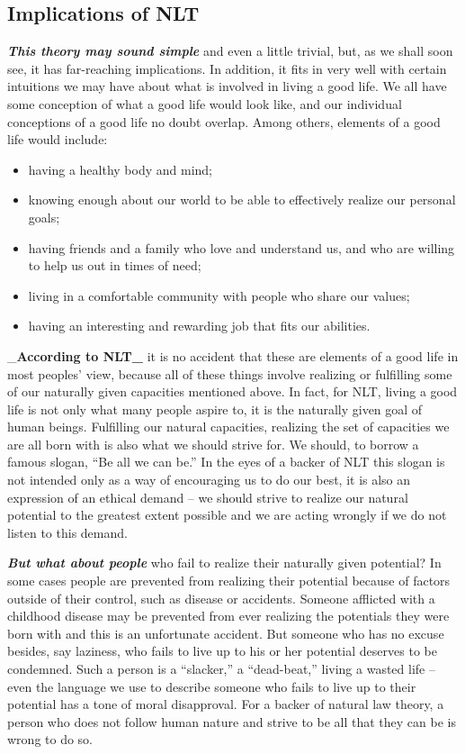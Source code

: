 \documentclass[12pt, openany]{book}
\providecommand{\tightlist}{%
  \setlength{\itemsep}{0pt}\setlength{\parskip}{0pt}}
\begin{document}
\hypertarget{implications-of-nlt}{%
\subsection*{Implications of NLT}\label{implications-of-nlt}}


\textbf{\emph{This theory may sound simple}} and even a little trivial, but, as we shall soon see, it has far-reaching implications. In addition, it fits in very well with certain intuitions we may have about what is involved in living a good life. We all have some conception of what a good life would look like, and our individual conceptions of a good life no doubt overlap. Among others, elements of a good life would include:

\begin{itemize}
\tightlist
\item
  having a healthy body and mind;
\item
  knowing enough about our world to be able to effectively realize our personal goals;
\item
  having friends and a family who love and understand us, and who are willing to help us out in times of need;
\item
  living in a comfortable community with people who share our values;
\item
  having an interesting and rewarding job that fits our abilities.
\end{itemize}

\_\textbf{According to NLT\_} it is no accident that these are elements of a good life in most peoples' view, because all of these things involve realizing or fulfilling some of our naturally given capacities mentioned above. In fact, for NLT, living a good life is not only what many people aspire to, it is the naturally given goal of human beings. Fulfilling our natural capacities, realizing the set of capacities we are all born with is also what we should strive for. We should, to borrow a famous slogan, ``Be all we can be.'' In the eyes of a backer of NLT this slogan is not intended only as a way of encouraging us to do our best, it is also an expression of an ethical demand -- we should strive to realize our natural potential to the greatest extent possible and we are acting wrongly if we do not listen to this demand.

\textbf{\emph{But what about people}} who fail to realize their naturally given potential? In some cases people are prevented from realizing their potential because of factors outside of their control, such as disease or accidents. Someone afflicted with a childhood disease may be prevented from ever realizing the potentials they were born with and this is an unfortunate accident. But someone who has no excuse besides, say laziness, who fails to live up to his or her potential deserves to be condemned. Such a person is a ``slacker,'' a ``dead-beat,'' living a wasted life -- even the language we use to describe someone who fails to live up to their potential has a tone of moral disapproval. For a backer of natural law theory, a person who does not follow human nature and strive to be all that they can be is wrong to do so.
\end{document}
